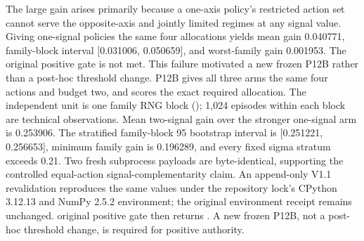 {}
\markdownRendererSectionEnd \markdownRendererSectionBegin
{}\markdownRendererInterblockSeparator
{}The large gain arises primarily because a one-axis policy's restricted action set cannot serve the opposite-axis and jointly limited regimes at any signal value.\markdownRendererInterblockSeparator
{}Giving one-signal policies the same four allocations yields mean gain 0.040771, family-block interval [0.031006, 0.050659], and worst-family gain 0.001953. The original positive gate is not met. This failure motivated a new frozen P12B rather than a post-hoc threshold change.\markdownRendererInterblockSeparator
{}
\markdownRendererSectionEnd \markdownRendererSectionBegin
{}\markdownRendererInterblockSeparator
{}P12B gives all three arms the same four actions and budget two, and scores the exact required allocation. The independent unit is one family RNG block (); 1,024 episodes within each block are technical observations. Mean two-signal gain over the stronger one-signal arm is 0.253906. The stratified family-block 95\markdownRendererPercentSign{} bootstrap interval is [0.251221, 0.256653], minimum family gain is 0.196289, and every fixed sigma stratum exceeds 0.21. Two fresh subprocess payloads are byte-identical, supporting the controlled equal-action signal-complementarity claim. An append-only V1.1 revalidation reproduces the same values under the repository lock's CPython 3.12.13 and NumPy 2.5.2 environment; the original environment receipt remains unchanged. original positive gate then returns . A new frozen P12B, not a post-hoc threshold change, is required for positive authority.
\markdownRendererSectionEnd 
\markdownRendererSectionEnd \markdownRendererDocumentEnd